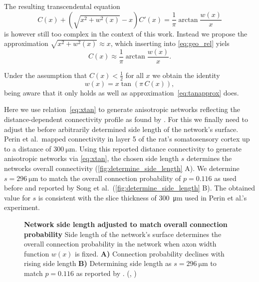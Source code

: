 The resulting transcendental equation
\[C(x) + \left(\sqrt{x^2+w^2(x)} -
x\right) C'(x) = \frac{1}{\pi} \operatorname{arctan}
\frac{w(x)}{x}\]
is however still too complex in the context of this work. Instead we
propose the approximation $\sqrt{x^2 + w^2(x)} \approx  x$, which
inserting into \ref{eq:geo_rel} yiels
\begin{equation}
C(x) \approx \frac{1}{\pi} \operatorname{arctan} \label{eq:tanapprox}
\frac{w(x)}{x}.
\end{equation}

Under the assumption that $C(x)<\frac{1}{2}$ for all $x$ we obtain the
identity
\begin{equation}
  w(x) = x \tan\left( \pi\, C(x) \right), \label{eq:xtan}
\end{equation} 
being aware that it only holds as well as
approximation~\ref{eq:tanapprox} does. 

Here we use relation~\ref{eq:xtan} to generate anisotropic networks
reflecting the dis\-tance-de\-pendent connectivity profile as found by
\textcite{Perin2011}. For this we finally need to adjust the before
arbitrarily determined side length of the network's surface. Perin et
al.~mapped connectivity in layer 5 of the rat's somatosensory cortex
up to a distance of $\SI{300}{\micro\meter}$. Using this reported
distance connectivity to generate anisotropic networks via
\ref{eq:xtan}, the chosen side length $s$ determines the networks
overall connectivity (\autoref{fig:determine_side_length} A). We
determine $s = \SI{296}{\micro\meter}$ to match the overall connection
probability of $p = 0.116$ as used before and reported by Song et
al.~(\autoref{fig:determine_side_length} B). The obtained value for
$s$ is consistent with the slice thickness of \SI{300}{\micro\meter}
used in Perin et al.'s experiment.


\begin{figure}[htp]
  \centering
  \captionsetup{skip=7pt}
  \caption{\textbf{Network side length adjusted to match overall
      connection probability} Side length of the network's surface
    determines the overall connection probability in the network when
    axon width function $w(x)$ is fixed. \textbf{A)} Connection
    probability declines with rising side length \textbf{B)}
    Determining side length as $s=\SI{296}{\micro\meter}$ to match $p
    = 0.116$ as reported by \textcite{Song2005}. (,
    )}
  \label{fig:determine_side_length}
\end{figure}



